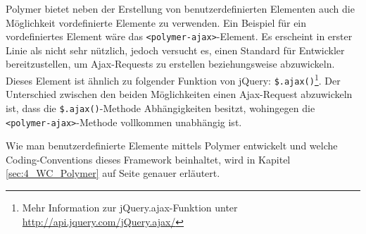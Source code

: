 Polymer bietet neben der Erstellung von benutzerdefinierten Elementen auch die Möglichkeit vordefinierte Elemente zu verwenden. Ein Beispiel für ein vordefiniertes Element wäre das \lstinline|<polymer-ajax>|-Element. Es erscheint in erster Linie als nicht sehr nützlich, jedoch versucht es, einen Standard für Entwickler bereitzustellen, um Ajax-Requests zu erstellen beziehungsweise abzuwickeln. Dieses Element ist ähnlich zu folgender Funktion von jQuery: \lstinline{$.ajax()}\footnote{Mehr Information zur jQuery.ajax-Funktion unter \href{http://api.jquery.com/jQuery.ajax/}{http://api.jquery.com/jQuery.ajax/}}. Der Unterschied zwischen den beiden Möglichkeiten einen Ajax-Request abzuwickeln ist, dass die \lstinline{$.ajax()}-Methode Abhängigkeiten besitzt, wohingegen die \lstinline|<polymer-ajax>|-Methode vollkommen unabhängig ist.

Wie man benutzerdefinierte Elemente mittels Polymer entwickelt und welche Coding-Conventions dieses Framework beinhaltet, wird in Kapitel \ref{sec:4_WC_Polymer} auf Seite \pageref{sec:4_WC_Polymer} genauer erläutert.